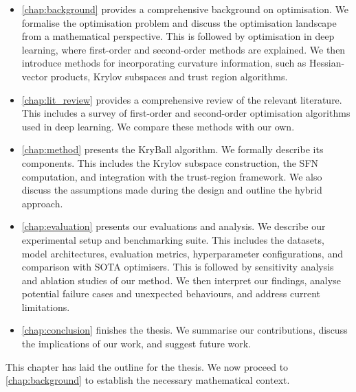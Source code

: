 \begin{itemize}
    \item \cref{chap:background} provides a comprehensive background on optimisation. We formalise the optimisation problem and discuss the optimisation landscape from a mathematical perspective. This is followed by optimisation in deep learning, where first-order and second-order methods are explained. We then introduce methods for incorporating curvature information, such as Hessian-vector products, Krylov subspaces and trust region algorithms.
    \item \cref{chap:lit_review} provides a comprehensive review of the relevant literature. This includes a survey of first-order and second-order optimisation algorithms used in deep learning. We compare these methods with our own.
    \item \cref{chap:method} presents the KryBall algorithm. We formally describe its components. This includes the Krylov subspace construction, the SFN computation, and integration with the trust-region framework. We also discuss the assumptions made during the design and outline the hybrid approach.
    \item \cref{chap:evaluation} presents our evaluations and analysis. We describe our experimental setup and benchmarking suite. This includes the datasets, model architectures, evaluation metrics, hyperparameter configurations, and comparison with SOTA optimisers. This is followed by sensitivity analysis and ablation studies of our method. We then interpret our findings, analyse potential failure cases and unexpected behaviours, and address current limitations. 
    \item \cref{chap:conclusion} finishes the thesis. We summarise our contributions, discuss the implications of our work, and suggest future work.
\end{itemize}

This chapter has laid the outline for the thesis. We now proceed to \cref{chap:background} to establish the necessary mathematical context.